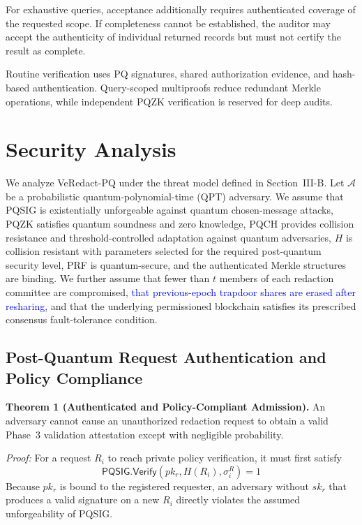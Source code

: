 \documentclass[lettersize,journal]{IEEEtran}
\begin{document}
For exhaustive queries, acceptance
additionally requires authenticated
coverage of the requested scope.
If completeness cannot be established,
the auditor may accept the authenticity
of individual returned records but
must not certify the result as complete.

Routine verification uses PQ signatures,
shared authorization evidence, and
hash-based authentication. Query-scoped
multiproofs reduce redundant Merkle
operations, while independent PQZK
verification is reserved for deep audits.






\section{Security Analysis}
\label{sec:security}

We analyze VeRedact-PQ under the threat model defined in
Section~III-B. Let $\mathcal{A}$ be a probabilistic
quantum-polynomial-time (QPT) adversary. We assume that PQSIG is
existentially unforgeable against quantum chosen-message attacks,
PQZK satisfies quantum soundness and zero knowledge, PQCH provides
collision resistance and threshold-controlled adaptation against
quantum adversaries, $H$ is collision resistant with parameters
selected for the required post-quantum security level, PRF is
quantum-secure, and the authenticated Merkle structures are binding.
We further assume that fewer than $t$ members of each redaction
committee are compromised\textcolor{blue}{, that previous-epoch trapdoor
shares are erased after resharing,} and that the underlying permissioned
blockchain satisfies its prescribed consensus fault-tolerance
condition.

\subsection{Post-Quantum Request Authentication and Policy Compliance}

\textbf{Theorem 1 (Authenticated and Policy-Compliant Admission).}
An adversary cannot cause an unauthorized redaction request to obtain
a valid Phase~3 validation attestation except with negligible
probability.

\emph{Proof:}
For a request $R_i$ to reach private policy verification, it must
first satisfy
\begin{equation}
\mathsf{PQSIG.Verify}
(pk_r,H(R_i),\sigma_i^{R})=1
\label{eq:sec_req_auth}
\end{equation}
Because $pk_r$ is bound to the registered requester, an adversary
without $sk_r$ that produces a valid signature on a new $R_i$ directly
violates the assumed unforgeability of PQSIG.
\end{document}
